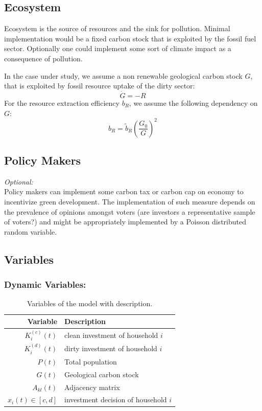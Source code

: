 \subsection{Ecosystem}
Ecosystem is the source of resources and the sink for pollution. Minimal implementation would be a fixed carbon stock that is exploited by the fossil fuel sector. Optionally one could implement some sort of climate impact as a consequence of pollution.

In the case under study, we assume a non renewable geological carbon stock $G$, that is exploited by fossil resource uptake of the dirty sector:
\begin{equation}
	\dot{G} = -R
	\label{resource_dynamics}
\end{equation}
For the resource extraction efficiency $b_R$, we assume the following dependency on $G$:
\begin{equation}
	b_R = \tilde{b}_R \left( \frac{G_0}{G} \right)^{2}
	\label{extraction_efficiency}
\end{equation}

\subsection{Policy Makers}
\textit{Optional:} \\
Policy makers can implement some carbon tax or carbon cap on economy to incentivize green development. The implementation of such measure depends on the prevalence of opinions amongst voters (are investors a representative sample of voters?) and might be appropriately implemented by a Poisson distributed random variable.

\subsection{Variables}

\subsubsection{Dynamic Variables:}

\begin{table}[H]
	\centering
	\begin{tabular}{r|l}
		Variable & Description \\\hline
		$K^{(c)}_i(t)$ & clean investment of household $i$ \\
		$K^{(d)}_i(t)$ & dirty investment of household $i$ \\
		$P(t)$ & Total population \\
		$G(t)$ & Geological carbon stock \\
		$A_{kl}(t)$ & Adjacency matrix \\
		$x_i(t) \in [c,d]$ & investment decision of household $i$ 
	\end{tabular}
	\caption{Variables of the model with description.}
	\label{tab:independent_variables}
\end{table}

